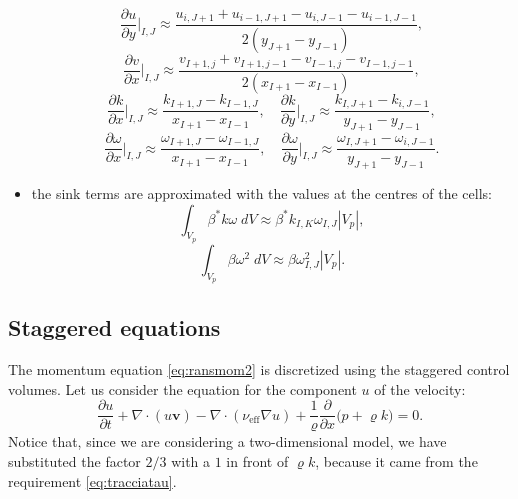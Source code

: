 \begin{itemize}
	\begin{equation}
		\frac{\partial u}{\partial y}\Big|_{I,J} \approx 
		\frac{u_{i,J+1}+u_{i-1,J+1}-u_{i,J-1}-u_{i-1,J-1}}{2(y_{J+1}-y_{J-1})},
	\end{equation}
	\begin{equation}
	\frac{\partial v}{\partial x} \Big|_{I,J} \approx 
	\frac{v_{I+1,j}+v_{I+1,j-1}-v_{I-1,j}-v_{I-1,j-1}}{2(x_{I+1}-x_{I-1})},
	\end{equation}
	\begin{equation}
		\frac{\partial k}{\partial x}\Big|_{I,J} \approx \frac{k_{I+1,J} - 
		k_{I-1,J}}{x_{I+1} - x_{I-1}}, 
		\quad \frac{\partial k}{\partial y}\Big|_{I,J} \approx 
		\frac{k_{I,J+1}-k_{i,J-1}}{y_{J+1}-y_{J-1}},
	\end{equation}
	\begin{equation}
		\frac{\partial \omega}{\partial x}\Big|_{I,J} \approx 
		\frac{\omega_{I+1,J} - \omega_{I-1,J}}{x_{I+1} - x_{I-1}}, \quad 
		\frac{\partial \omega}{\partial y}\Big|_{I,J} \approx 
		\frac{\omega_{I,J+1}-\omega_{i,J-1}}{y_{J+1}-y_{J-1}}.
	\end{equation}
	\item the sink terms are approximated with the values at the centres of the 
	cells:
	\begin{equation}
		\int_{V_p} \beta^* k \omega \; dV \approx 
		\beta^*k_{I,K}\omega_{I,J}|V_p|,
	\end{equation}
	\begin{equation}
		\int_{V_p} \beta \omega^2 \; dV \approx \beta \omega_{I,J}^2 |V_p|.
	\end{equation}
\end{itemize}
%
\subsection{Staggered equations}
The momentum equation \eqref{eq:ransmom2} is discretized using the staggered 
control volumes. Let us consider the equation for the component $u$ of the 
velocity:
\begin{equation} \label{eq:stagu}
\frac{\partial u}{\partial t} + \nabla \cdot ( u \mathbf{v}) - \nabla \cdot 
(\nu_\text{eff} \nabla u) + \frac{1}{\varrho} \frac{\partial}{\partial x} 
\big(p 
+ \varrho k\big) = 0.
\end{equation}
Notice that, since we are considering a two-dimensional model, we have 
substituted the factor $2/3$ with a $1$ in front of $\varrho k$, because it 
came from the requirement \eqref{eq:tracciatau}.

